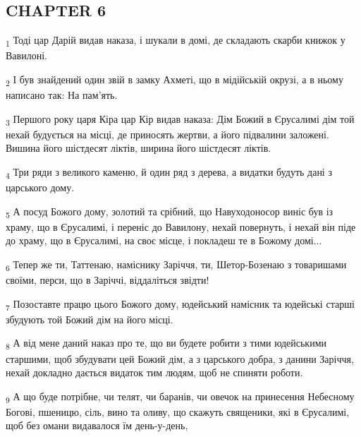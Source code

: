 \subsection{CHAPTER 6}
\begin{tcolorbox}
\textsubscript{1} Тоді цар Дарій видав наказа, і шукали в домі, де складають скарби книжок у Вавилоні.
\end{tcolorbox}
\begin{tcolorbox}
\textsubscript{2} І був знайдений один звій в замку Ахметі, що в мідійській окрузі, а в ньому написано так: На пам'ять.
\end{tcolorbox}
\begin{tcolorbox}
\textsubscript{3} Першого року царя Кіра цар Кір видав наказа: Дім Божий в Єрусалимі дім той нехай будується на місці, де приносять жертви, а його підвалини заложені. Вишина його шістдесят ліктів, ширина його шістдесят ліктів.
\end{tcolorbox}
\begin{tcolorbox}
\textsubscript{4} Три ряди з великого каменю, й один ряд з дерева, а видатки будуть дані з царського дому.
\end{tcolorbox}
\begin{tcolorbox}
\textsubscript{5} А посуд Божого дому, золотий та срібний, що Навуходоносор виніс був із храму, що в Єрусалимі, і переніс до Вавилону, нехай повернуть, і нехай він піде до храму, що в Єрусалимі, на своє місце, і покладеш те в Божому домі...
\end{tcolorbox}
\begin{tcolorbox}
\textsubscript{6} Тепер же ти, Таттенаю, наміснику Заріччя, ти, Шетор-Бозенаю з товаришами своїми, перси, що в Заріччі, віддаліться звідти!
\end{tcolorbox}
\begin{tcolorbox}
\textsubscript{7} Позоставте працю цього Божого дому, юдейський намісник та юдейські старші збудують той Божий дім на його місці.
\end{tcolorbox}
\begin{tcolorbox}
\textsubscript{8} А від мене даний наказ про те, що ви будете робити з тими юдейськими старшими, щоб збудувати цей Божий дім, а з царського добра, з данини Заріччя, нехай докладно дається видаток тим людям, щоб не спиняти роботи.
\end{tcolorbox}
\begin{tcolorbox}
\textsubscript{9} А що буде потрібне, чи телят, чи баранів, чи овечок на принесення Небесному Богові, пшеницю, сіль, вино та оливу, що скажуть священики, які в Єрусалимі, щоб без омани видавалося їм день-у-день,
\end{tcolorbox}
